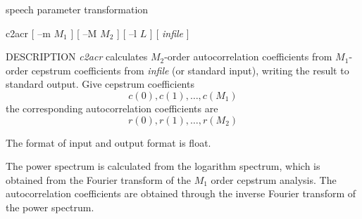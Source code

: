 % 
% 
% 
% 
%                                                                        
%
\hypertarget{c2acr}{}
%
{speech parameter transformation}

\begin{synopsis}
\item[c2acr] [ --m $M_1$ ] [ --M $M_2$ ] [ --l $L$ ] [ {\em infile} ]
\end{synopsis}

\begin{qsection}{DESCRIPTION}
{\em c2acr} calculates $M_2$-order autocorrelation coefficients 
from $M_1$-order cepstrum coefficients from {\em infile} (or standard input), 
writing the result to standard output.
Give cepstrum coefficients
\begin{displaymath}
c(0), c(1), \ldots, c(M_1)
\end{displaymath}
the corresponding autocorrelation coefficients are
\begin{displaymath}
r(0), r(1), \ldots, r(M_2)
\end{displaymath}

The format of input and output format is float.

The power spectrum is calculated from the logarithm spectrum,
which is obtained from the Fourier transform of the $M_1$
order cepstrum analysis.
The autocorrelation coefficients are obtained through the inverse
Fourier transform of the power spectrum.
\end{qsection}

